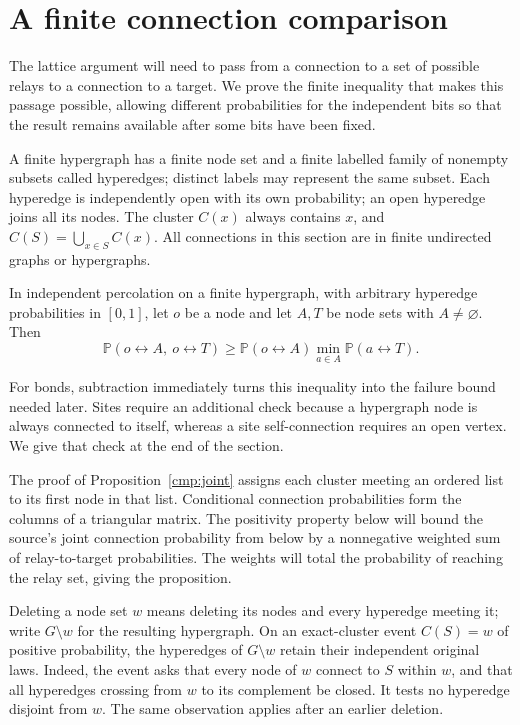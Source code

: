\section{A finite connection comparison}\label{sec:comparison}

The lattice argument will need to pass from a connection to a set of possible
relays to a connection to a target. We prove the finite inequality that makes
this passage possible, allowing different probabilities for the independent
bits so that the result remains available after some bits have been fixed.

A finite hypergraph has a finite node set and a finite labelled family of
nonempty subsets called hyperedges; distinct labels may represent the same
subset. Each hyperedge is independently open with its own probability; an
open hyperedge joins all its nodes. The cluster $C(x)$ always
contains $x$, and $C(S)=\bigcup_{x\in S}C(x)$. All connections in this section
are in finite undirected graphs or hypergraphs.

\begin{proposition}\label{cmp:joint}
In independent percolation on a finite hypergraph, with arbitrary hyperedge
probabilities in $[0,1]$, let $o$ be a node and let $A,T$ be node sets with
$A\ne\varnothing$. Then
\begin{equation}\label{cmp:joint-bound}
 \mathbb P(o\leftrightarrow A,\ o\leftrightarrow T)
 \ge \mathbb P(o\leftrightarrow A)
       \min_{a\in A}\mathbb P(a\leftrightarrow T).
\end{equation}
\end{proposition}

For bonds, subtraction immediately turns this inequality into the failure
bound needed later. Sites require an additional check because a hypergraph
node is always connected to itself, whereas a site self-connection requires
an open vertex. We give that check at the end of the section.

The proof of Proposition~\ref{cmp:joint} assigns each cluster meeting an
ordered list to its first node in that list. Conditional connection probabilities form the columns
of a triangular matrix. The positivity property below will bound the source's
joint connection probability from below by a nonnegative weighted sum of relay-to-target
probabilities. The weights will total the probability of reaching the relay
set, giving the proposition.

Deleting a node set $w$ means deleting its nodes and every hyperedge meeting
it; write $G\setminus w$ for the resulting hypergraph. On an exact-cluster
event $C(S)=w$ of positive probability, the hyperedges of $G\setminus w$
retain their independent original laws. Indeed, the event asks that every
node of $w$ connect to $S$ within $w$, and that all hyperedges crossing from
$w$ to its complement be closed. It tests no hyperedge disjoint from $w$.
The same observation applies after an earlier deletion.

